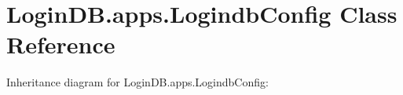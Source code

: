 \hypertarget{class_login_d_b_1_1apps_1_1_logindb_config}{}\section{Login\+D\+B.\+apps.\+Logindb\+Config Class Reference}
\label{class_login_d_b_1_1apps_1_1_logindb_config}


Inheritance diagram for Login\+D\+B.\+apps.\+Logindb\+Config\+:
